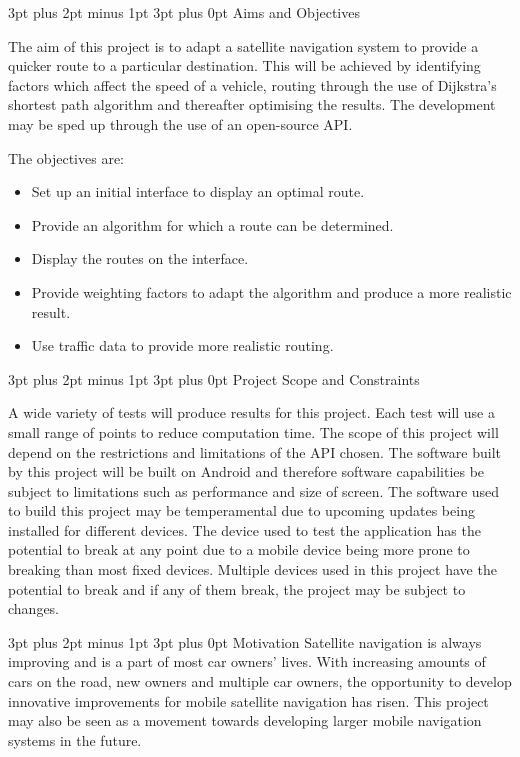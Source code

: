 \documentclass[12pt,a4paper]{article}
\makeatletter
\renewcommand\subsection{\@startsection {subsection}{1}{0mm} %
                               {3pt plus 2pt minus 1pt} %
                               {3pt plus 0pt} %
                               {\normalfont\bfseries}}
\makeatother
\begin{document}
\subsection{Aims and Objectives}

The aim of this project is to adapt a satellite navigation system to provide a quicker route to a particular destination. This will be achieved by identifying factors which affect the speed of a vehicle, routing through the use of Dijkstra’s shortest path algorithm and thereafter optimising the results. The development may be sped up through the use of an open-source API.

The objectives are: 
\begin{itemize}
  \item 	Set up an initial interface to display an optimal route.
  \item Provide an algorithm for which a route can be determined.
  \item Display the routes on the interface.
  \item 	Provide weighting factors to adapt the algorithm and produce a more realistic result.
  \item Use traffic data to provide more realistic routing.
\end{itemize}	


\subsection{Project Scope and Constraints}

A wide variety of tests will produce results for this project. Each test will use a small range of points to reduce computation time. The scope of this project will depend on the restrictions and limitations of the API chosen. The software built by this project will be built on Android and therefore software capabilities be subject to limitations such as performance and size of screen. The software used to build this project may be temperamental due to upcoming updates being installed for different devices. The device used to test the application has the potential to break at any point due to a mobile device being more prone to breaking than most fixed devices. Multiple devices used in this project have the potential to break and if any of them break, the project may be subject to changes. 

\subsection{Motivation}
Satellite navigation is always improving and is a part of most car owners' lives. With increasing amounts of cars on the road, new owners and multiple car owners, the opportunity to develop innovative improvements for mobile satellite navigation has risen. This project may also be seen as a movement towards developing larger mobile navigation systems in the future.  
\end{document}
